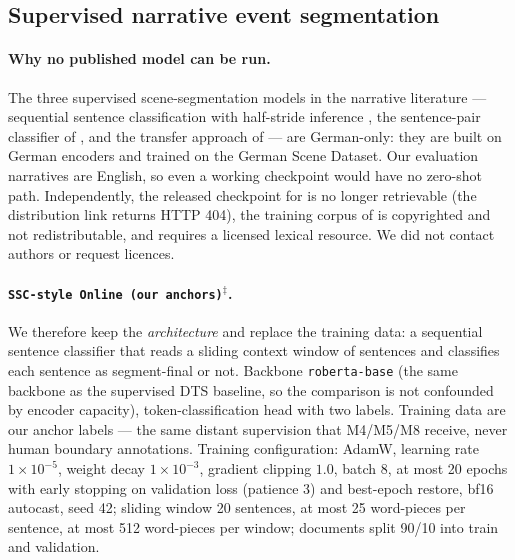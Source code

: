 \subsection{Supervised narrative event segmentation}
\label{app:baselines-ssc}

\paragraph{Why no published model can be run.}
The three supervised scene-segmentation models in the narrative literature ---
sequential sentence classification with half-stride inference
\citep{zehe2025assessing}, the sentence-pair classifier of
\citet{zehe2021detecting}, and the transfer approach of
\citet{kurfali2021breaking} --- are German-only: they are built on German
encoders and trained on the German Scene Dataset. Our evaluation narratives are
English, so even a working checkpoint would have no zero-shot path.
Independently, the released checkpoint for \citet{kurfali2021breaking} is no
longer retrievable (the distribution link returns HTTP 404), the training corpus
of \citet{zehe2025assessing} is copyrighted and not redistributable, and
\citet{barth2021participation} requires a licensed lexical resource. We did not
contact authors or request licences.

\paragraph{\texttt{SSC-style Online (our anchors)}$^{\ddagger}$.}
We therefore keep the \emph{architecture} and replace the training data: a
sequential sentence classifier that reads a sliding context window of sentences
and classifies each sentence as segment-final or not. Backbone
\texttt{roberta-base} (the same backbone as the supervised DTS baseline, so the
comparison is not confounded by encoder capacity), token-classification head
with two labels. Training data are our anchor labels --- the same distant
supervision that M4/M5/M8 receive, never human boundary annotations. Training
configuration: AdamW, learning rate $1\times10^{-5}$, weight decay $1\times
10^{-3}$, gradient clipping $1.0$, batch $8$, at most 20 epochs with early
stopping on validation loss (patience 3) and best-epoch restore, bf16 autocast,
seed 42; sliding window 20 sentences, at most 25 word-pieces per sentence, at
most 512 word-pieces per window; documents split 90/10 into train and
validation.

